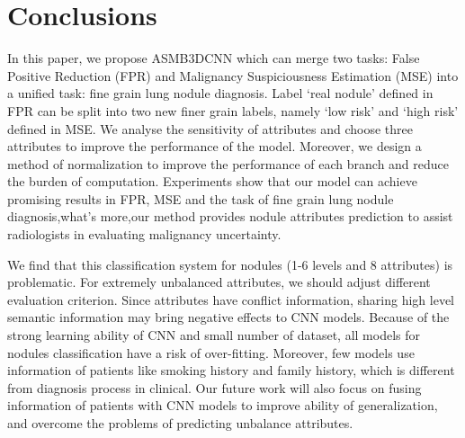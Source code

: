 \documentclass[runningheads]{llncs}
\begin{document}
\section{Conclusions}
\label{conclude}
In this paper, we propose ASMB3DCNN which can merge two tasks: False Positive Reduction (FPR) and Malignancy Suspiciousness Estimation (MSE) into a unified task: fine grain lung nodule diagnosis. Label `real nodule' defined in FPR can be split into two new finer grain labels, namely `low risk' and `high risk' defined in MSE.
We analyse the sensitivity of attributes and choose three attributes to improve the performance of the model.
Moreover, we design a method of normalization to improve the performance of each branch and reduce the burden of computation.
Experiments show that our model can achieve promising results in FPR, MSE and the task of fine grain lung nodule diagnosis,what's more,our method provides nodule attributes prediction to assist radiologists in evaluating malignancy uncertainty.

 We find that this classification system for nodules (1-6 levels and 8 attributes) is problematic. For extremely unbalanced attributes, we should adjust different evaluation criterion. Since attributes have conflict information,  sharing high level semantic information may bring negative effects to CNN models. 
Because of the strong learning ability of CNN and small number of dataset, all models for nodules classification have a risk of over-fitting. Moreover, few models use information of patients like smoking history and family history, which is different from diagnosis process in clinical. Our future work will also focus on fusing information of patients with CNN models to improve ability of generalization, and overcome the problems of predicting unbalance attributes.
 

%

%
%
\end{document}
